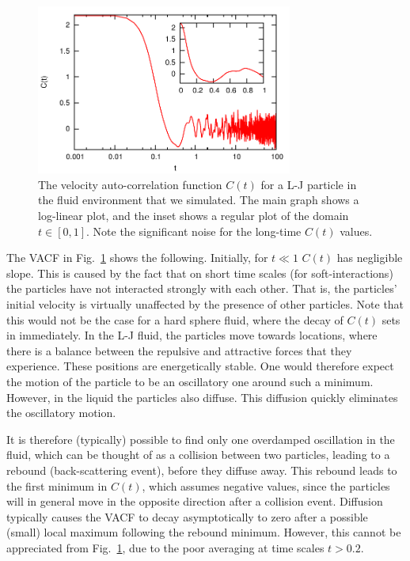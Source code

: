 \documentclass[
paper=a4,                       %
fontsize=11pt,                  %
twoside,                        %
footsepline,                    %
headsepline,                    %
headinclude=false,              %
footinclude=false,              %
pagesize,                       %
]{scrartcl}
\begin{document}
\begin{figure}[!ht]
\begin{center}
\includegraphics[width=0.75\textwidth]{figures/vacf}
\caption{\label{fig:vacf} The velocity auto-correlation function $C(t)$ for a L-J particle in the fluid environment that we simulated. The main graph shows a log-linear plot, and the inset shows a regular plot of the domain $t \in [0,1]$. Note the significant noise for the long-time $C(t)$ values.}
\end{center}
\end{figure}

\noindent The VACF in Fig.~\ref{fig:vacf} shows the following. Initially, for $t \ll 1$ $C(t)$ has negligible slope. This is caused by the fact that on short time scales (for soft-interactions) the particles have not interacted strongly with each other. That is, the particles' initial velocity is virtually unaffected by the presence of other particles. Note that this would not be the case for a hard sphere fluid, where the decay of $C(t)$ sets in immediately. In the L-J fluid, the particles move towards locations, where there is a balance between the repulsive and attractive forces that they experience. These positions are energetically stable. One would therefore expect the motion of the particle to be an oscillatory one around such a minimum. However, in the liquid the particles also diffuse. This diffusion quickly eliminates the oscillatory motion.

It is therefore (typically) possible to find only one overdamped oscillation in the fluid, which can be thought of as a collision between two particles, leading to a rebound (back-scattering event), before they diffuse away. This rebound leads to the first minimum in $C(t)$, which assumes negative values, since the particles will in general move in the opposite direction after a collision event. Diffusion typically causes the VACF to decay asymptotically to zero after a possible (small) local maximum following the rebound minimum. However, this cannot be appreciated from Fig.~\ref{fig:vacf}, due to the poor averaging at time scales $t > 0.2$.  
\end{document}
